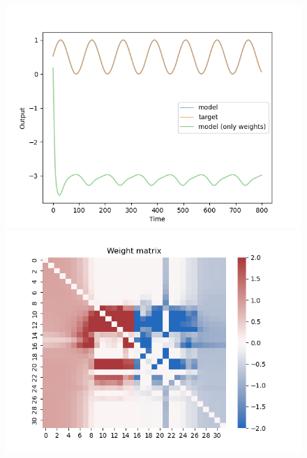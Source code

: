 \documentclass[12pt, a4paper]{article}
\begin{document}
\begin{figure}[H]
    \centering
    \includegraphics[width=\textwidth]{RNN/ourRNN/analysis/fig/0221_SIN2_bphcppt_output.png} \\
    \includegraphics[width=\textwidth]{RNN/ourRNN/analysis/fig/0221_SIN2_bphcppt_weight_matrix.png}
\end{figure}
\end{document}
